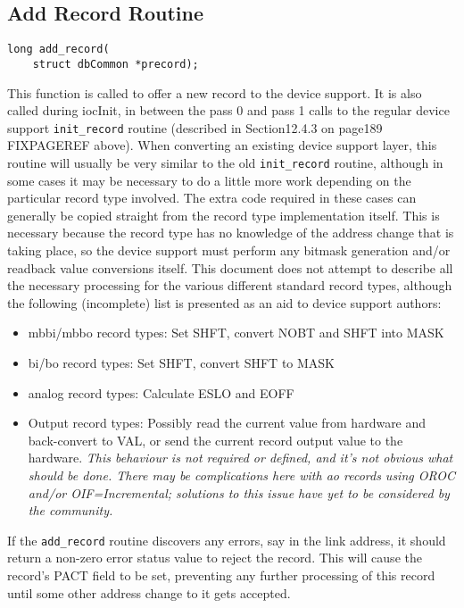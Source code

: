 \subsection{Add Record Routine}

\begin{verbatim}
long add_record(
    struct dbCommon *precord);
\end{verbatim}This function is called to offer a new record to the device support. It is also called during iocInit, in between the pass 0 and 
pass 1 calls to the regular device support \verb|init_record| routine (described in Section12.4.3 on page189 FIXPAGEREF above). When 
converting an existing device support layer, this routine will usually be very similar to the old \verb|init_record| routine, 
although in some cases it may be necessary to do a little more work depending on the particular record type involved. The 
extra code required in these cases can generally be copied straight from the record type implementation itself. This is 
necessary because the record type has no knowledge of the address change that is taking place, so the device support must 
perform any bitmask generation and/or readback value conversions itself. This document does not attempt to describe all 
the necessary processing for the various different standard record types, although the following (incomplete) list is 
presented as an aid to device support authors:

\begin{itemize}\item mbbi/mbbo record types: Set SHFT, convert NOBT and SHFT into MASK

\item bi/bo record types: Set SHFT, convert SHFT to MASK

\item analog record types: Calculate ESLO and EOFF

\item Output record types: Possibly read the current value from hardware and back-convert to VAL, or send the current 
record output value to the hardware. \emph{This behaviour is not required or defined, and it's not obvious what should be done. There may be complications here with ao records using OROC and/or OIF=Incremental; solutions to this issue have yet to be considered by the community.}

\end{itemize}If the \verb|add_record| routine discovers any errors, say in the link address, it should return a non-zero error status value to 
reject the record. This will cause the record's PACT field to be set, preventing any further processing of this record until 
some other address change to it gets accepted.


